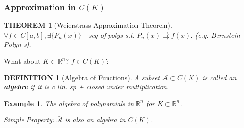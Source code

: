\documentclass[12pt]{article}
\theoremstyle{blueplain}
\newtheorem{theorem}{THEOREM}[section]
\theoremstyle{bluedef}
\newtheorem{definition}{DEFINITION}[section]
\theoremstyle{blueremark}
\newtheorem{example}{Example}[section]
\newcommand{\R}{\mathbb{R}}
\numberwithin{equation}{section}
\begin{document}
      \subsubsection{Approximation in $C(K)$}

      \begin{theorem}[Weierstrass Approximation Theorem]
        $\forall f \in C[a,b], \exists \{P_n(x)\}$ - seq of polys s.t. $P_n(x) \rightrightarrows f(x)$.
        (e.g. Bernstein Polyn-s).
      \end{theorem}

      What about $K \subset \R^n$? $f \in C(K)$?

      \begin{definition}[Algebra of Functions]
        A subset $\mathcal{A} \subset C(K)$ is called an \textbf{algebra} if it is a lin. sp + closed under multiplication.
      \end{definition}

      \begin{example}
        The algebra of polynomials in $\R^n$ for $K \subset \R^n$.

        Simple Property: $\bar{\mathcal{A}}$ is also an algebra in $C(K)$.
      \end{example}
\end{document}
